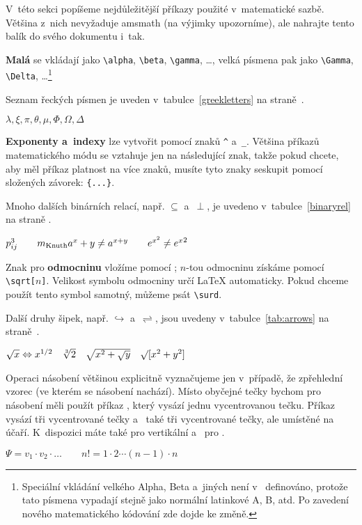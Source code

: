 V~této sekci popíšeme nejdůležitější příkazy použité v~matematické sazbě.
Většina z~nich nevyžaduje \textsf{amsmath} (na výjimky upozorníme),
ale nahrajte tento balík do svého dokumentu i~tak.

\textbf{Malá } se vkládají jako \verb|\alpha|,
 \verb|\beta|, \verb|\gamma|, \ldots, velká písmena
pak jako \verb|\Gamma|, \verb|\Delta|, \ldots\footnote{Speciální vkládání
velkého Alpha, Beta a~jiných není v~\LaTeXe{} definováno, protože
tato písmena vypadají stejně jako normální latinkové A, B, atd.
Po zavedení nového matematického kódování zde dojde ke změně.}

Seznam řeckých písmen je uveden v~tabulce~\ref{greekletters}
na straně~\pageref{greekletters}.
\begin{example}
$\lambda,\xi,\pi,\theta,
 \mu,\Phi,\Omega,\Delta$
\end{example}


\textbf{Exponenty a~indexy} lze vytvořit pomocí
znaků \verb|^| a~\verb|_|.
Většina příkazů matematického módu se vztahuje jen na následující znak,
takže pokud chcete, aby měl příkaz platnost na více znaků, musíte
tyto znaky seskupit pomocí složených závorek: \verb|{...}|.

Mnoho dalších binárních relací, např. $\subseteq$ a~$\perp$, je uvedeno
v~tabulce~\ref{binaryrel} na straně \pageref{binaryrel}.

\begin{example}
$p^3_{ij} \qquad
 m_\text{Knuth} \\[5pt]
 a^x+y \neq a^{x+y}\qquad 
 e^{x^2} \neq {e^x}^2$
\end{example}


Znak pro \textbf{odmocninu} vložíme pomocí ;
$n$-tou odmocninu získáme pomocí \verb|\sqrt[|$n$\verb|]|. Velikost
symbolu odmocniny určí \LaTeX{} automaticky. Pokud chceme použít
tento symbol samotný, můžeme psát \verb|\surd|.

Další druhy šipek, např. $\hookrightarrow$ a~$\rightleftharpoons$, jsou
uvedeny v~tabulce~\ref{tab:arrows} na straně~\pageref{tab:arrows}.
\begin{example}
$\sqrt{x}
 \Leftrightarrow x^{1/2}
 \quad \sqrt[3]{2}
 \quad \sqrt{x^{2} + \sqrt{y}}
 \quad \surd[x^2 + y^2]$
\end{example}


Operaci násobení většinou explicitně vyznačujeme jen v~případě, že
zpře\-hlední vzorec (ve kterém se násobení nachází). Místo obyčejné 
tečky bychom pro násobení měli použít příkaz , který vysází
jednu vycentrovanou tečku. Příkaz  vysází tři vycentrované
tečky a~ také tři vycentrované tečky, ale
umístěné na účaří. K~dispozici máte také  pro vertikální
a~ pro . 
\begin{example}
$\Psi = v_1 \cdot v_2
 \cdot \ldots \qquad 
 n! = 1 \cdot 2 
 \cdots (n-1) \cdot n$
\end{example}

